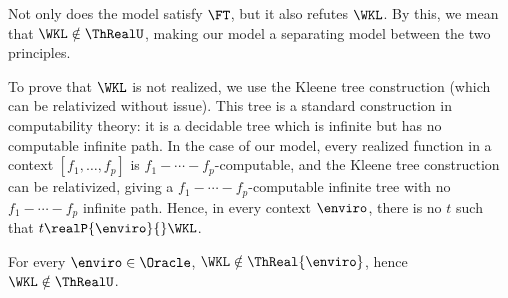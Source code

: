 Not only does the model satisfy $\FT$, but it also refutes $\WKL$. By this, we mean that $\WKL\notin\ThRealU$, making our model a separating model between the two principles.

To prove that $\WKL$ is not realized, we use the Kleene tree \cite{Kleene1953-KLERFA-3} construction (which can be relativized without issue). This tree is a standard construction in computability theory: it is a decidable tree which is infinite but has no computable infinite path. In the case of our model, every realized function in a context $[f_1,\ldots,f_p]$ is $f_1-\cdots-f_p$-computable, and the Kleene tree construction can be relativized, giving a $f_1-\cdots-f_p$-computable infinite tree with no $f_1-\cdots-f_p$ infinite path. Hence, in every context $\enviro$, there is no $t$ such that $t\realP{\enviro}{} \WKL$.



\begin{theorem}
  For every $\enviro \in \Oracle$, $\WKL\notin \ThReal{\enviro}$, hence $\WKL\notin \ThRealU$.
\end{theorem}


